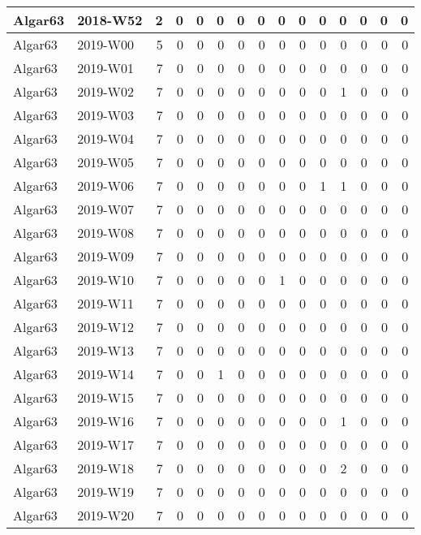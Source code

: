 \documentclass[]{book}
\begin{document}
\begin{table}
\begin{tabular}[t]{l|l|r|r|r|r|r|r|r|r|r|r|r|r|r}
\hline
Algar63 & 2018-W52 & 2 & 0 & 0 & 0 & 0 & 0 & 0 & 0 & 0 & 0 & 0 & 0 & 0\\
\hline
Algar63 & 2019-W00 & 5 & 0 & 0 & 0 & 0 & 0 & 0 & 0 & 0 & 0 & 0 & 0 & 0\\
\hline
Algar63 & 2019-W01 & 7 & 0 & 0 & 0 & 0 & 0 & 0 & 0 & 0 & 0 & 0 & 0 & 0\\
\hline
Algar63 & 2019-W02 & 7 & 0 & 0 & 0 & 0 & 0 & 0 & 0 & 0 & 1 & 0 & 0 & 0\\
\hline
Algar63 & 2019-W03 & 7 & 0 & 0 & 0 & 0 & 0 & 0 & 0 & 0 & 0 & 0 & 0 & 0\\
\hline
Algar63 & 2019-W04 & 7 & 0 & 0 & 0 & 0 & 0 & 0 & 0 & 0 & 0 & 0 & 0 & 0\\
\hline
Algar63 & 2019-W05 & 7 & 0 & 0 & 0 & 0 & 0 & 0 & 0 & 0 & 0 & 0 & 0 & 0\\
\hline
Algar63 & 2019-W06 & 7 & 0 & 0 & 0 & 0 & 0 & 0 & 0 & 1 & 1 & 0 & 0 & 0\\
\hline
Algar63 & 2019-W07 & 7 & 0 & 0 & 0 & 0 & 0 & 0 & 0 & 0 & 0 & 0 & 0 & 0\\
\hline
Algar63 & 2019-W08 & 7 & 0 & 0 & 0 & 0 & 0 & 0 & 0 & 0 & 0 & 0 & 0 & 0\\
\hline
Algar63 & 2019-W09 & 7 & 0 & 0 & 0 & 0 & 0 & 0 & 0 & 0 & 0 & 0 & 0 & 0\\
\hline
Algar63 & 2019-W10 & 7 & 0 & 0 & 0 & 0 & 0 & 1 & 0 & 0 & 0 & 0 & 0 & 0\\
\hline
Algar63 & 2019-W11 & 7 & 0 & 0 & 0 & 0 & 0 & 0 & 0 & 0 & 0 & 0 & 0 & 0\\
\hline
Algar63 & 2019-W12 & 7 & 0 & 0 & 0 & 0 & 0 & 0 & 0 & 0 & 0 & 0 & 0 & 0\\
\hline
Algar63 & 2019-W13 & 7 & 0 & 0 & 0 & 0 & 0 & 0 & 0 & 0 & 0 & 0 & 0 & 0\\
\hline
Algar63 & 2019-W14 & 7 & 0 & 0 & 1 & 0 & 0 & 0 & 0 & 0 & 0 & 0 & 0 & 0\\
\hline
Algar63 & 2019-W15 & 7 & 0 & 0 & 0 & 0 & 0 & 0 & 0 & 0 & 0 & 0 & 0 & 0\\
\hline
Algar63 & 2019-W16 & 7 & 0 & 0 & 0 & 0 & 0 & 0 & 0 & 0 & 1 & 0 & 0 & 0\\
\hline
Algar63 & 2019-W17 & 7 & 0 & 0 & 0 & 0 & 0 & 0 & 0 & 0 & 0 & 0 & 0 & 0\\
\hline
Algar63 & 2019-W18 & 7 & 0 & 0 & 0 & 0 & 0 & 0 & 0 & 0 & 2 & 0 & 0 & 0\\
\hline
Algar63 & 2019-W19 & 7 & 0 & 0 & 0 & 0 & 0 & 0 & 0 & 0 & 0 & 0 & 0 & 0\\
\hline
Algar63 & 2019-W20 & 7 & 0 & 0 & 0 & 0 & 0 & 0 & 0 & 0 & 0 & 0 & 0 & 0\\

\end{tabular}
\end{table}
\end{document}
